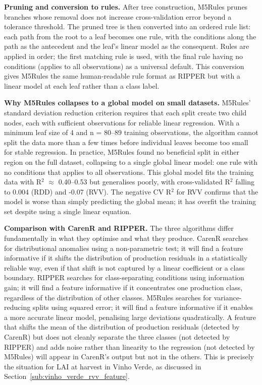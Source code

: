 \textbf{Pruning and conversion to rules. }After tree construction, M5Rules prunes branches whose removal does not increase cross-validation error beyond a tolerance threshold. The pruned tree is then converted into an ordered rule list: each path from the root to a leaf becomes one rule, with the conditions along the path as the antecedent and the leaf's linear model as the consequent. Rules are applied in order; the first matching rule is used, with the final rule having no conditions (applies to all observations) as a universal default. This conversion gives M5Rules the same human-readable rule format as RIPPER but with a linear model at each leaf rather than a class label.

\textbf{Why M5Rules collapses to a global model on small datasets. }M5Rules' standard deviation reduction criterion requires that each split create two child nodes, each with sufficient observations for reliable linear regression. With a minimum leaf size of 4 and n = 80--89 training observations, the algorithm cannot split the data more than a few times before individual leaves become too small for stable regression. In practice, M5Rules found no beneficial split in either region on the full dataset, collapsing to a single global linear model: one rule with no conditions that applies to all observations. This global model fits the training data with R$^2$ $\approx$ 0.40--0.53 but generalises poorly, with cross-validated R$^2$ falling to 0.004 (RDD) and -0.07 (RVV). The negative CV R$^2$ for RVV confirms that the model is worse than simply predicting the global mean; it has overfit the training set despite using a single linear equation.

\textbf{Comparison with CarenR and RIPPER. }The three algorithms differ fundamentally in what they optimise and what they produce. CarenR searches for distributional anomalies using a non-parametric test; it will find a feature informative if it shifts the distribution of production residuals in a statistically reliable way, even if that shift is not captured by a linear coefficient or a class boundary. RIPPER searches for class-separating conditions using information gain; it will find a feature informative if it concentrates one production class, regardless of the distribution of other classes. M5Rules searches for variance-reducing splits using squared error; it will find a feature informative if it enables a more accurate linear model, penalising large deviations quadratically. A feature that shifts the mean of the distribution of production residuals (detected by CarenR) but does not cleanly separate the three classes (not detected by RIPPER) and adds noise rather than linearity to the regression (not detected by M5Rules) will appear in CarenR's output but not in the others. This is precisely the situation for LAI at harvest in Vinho Verde, as discussed in Section~\ref{sub:vinho_verde_rvv_feature}.



